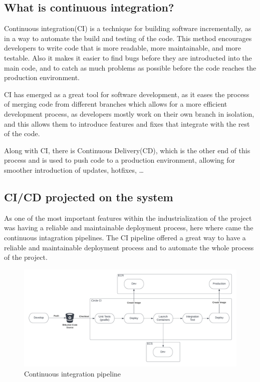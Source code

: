 \subsection{What is continuous integration?}

Continuous integration(CI) is a technique for building software incrementally, as in a way
to automate the build and testing of the code. This method encourages developers to 
write code that is more readable, more maintainable, and more testable. Also it makes
it easier to find bugs before they are introducted into the main code, and to
catch as much problems as possible before the code reaches the production environment.

CI has emerged as a great tool for software development, as it eases the process of
merging code from different branches which allows for a more efficient development process,
as developers mostly work on their own branch in isolation, and this allows them to 
introduce features and fixes that integrate with the rest of the code. \cite{ci_msft}

Along with CI, there is Continuous Delivery(CD), which is the other end of this process
and is used to push code to a production environment, allowing for smoother introduction
of updates, hotfixes, \dots

\subsection{CI/CD projected on the system}

As one of the most important features within the industrialization of the project
was having a reliable and maintainable deployment process, here where came the 
continuous intagration pipelines. The CI pipeline offered a great way to have
a reliable and maintainable deployment process and to automate the whole process
of the project.

\begin{figure}[!htpb]
    \centering
    \includegraphics[width=\textwidth]{images/ci-cd-pipeline.png}
    \caption{\footnotesize{Continuous integration pipeline}}
    \label{fig:ci-cd-pipeline}
\end{figure}


